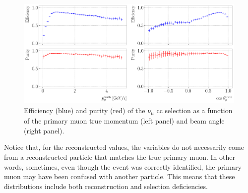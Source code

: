 \begin{figure}[t]
	\centering
	\includegraphics[width=.99\linewidth]{Images/GAr_selection/numuCC_selection_true_kinematics_performance.pdf}
	\caption[Efficiency and purity of the $\nu_{\mu}$ \gls{cc} selection as a function of the primary muon true momentum and beam angle.]{Efficiency (blue) and purity (red) of the $\nu_{\mu}$ \gls{cc} selection as a function of the primary muon true momentum (left panel) and beam angle (right panel).}
	\label{fig:numuCC_muon_kinematics}
\end{figure}

Notice that, for the reconstructed values, the variables do not necessarily come from a reconstructed particle that matches the true primary muon. In other words, sometimes, even though the event was correctly identified, the primary muon may have been confused with another particle. This means that these distributions include both reconstruction and selection deficiencies.

